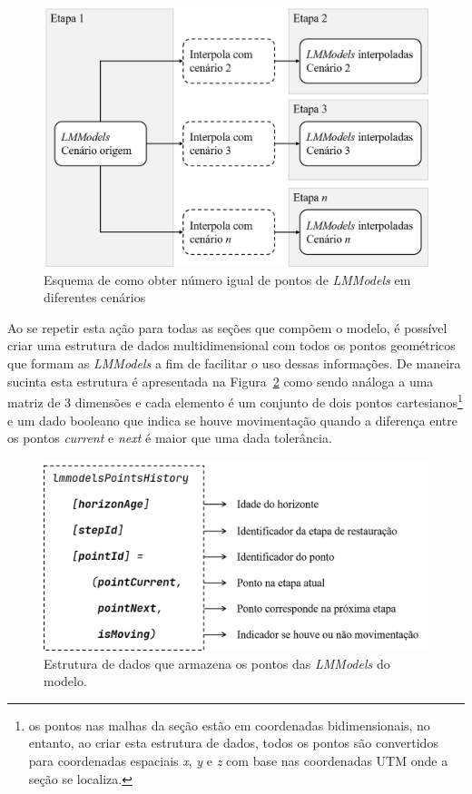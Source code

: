 \begin{figure} [H]
  \begin{center}
    \includegraphics[width=350pt]{images/fig-lmm-interp2}
    \caption{Esquema de como obter número igual de pontos de \textit{LMModels} em diferentes cenários}\label{fig-lmm-interp2}
  \end{center}
\end{figure}

Ao se repetir esta ação para todas as seções que compõem o modelo, é possível criar uma estrutura de dados multidimensional com todos os pontos geométricos que formam as \textit{LMModels} a fim de facilitar o uso dessas informações. De maneira sucinta esta estrutura é apresentada na Figura~\ref{fig-lmm-data-structure} como sendo análoga a uma matriz de 3 dimensões e cada elemento é um conjunto de dois pontos cartesianos\footnote{os pontos nas malhas da seção estão em coordenadas bidimensionais, no entanto, ao criar esta estrutura de dados, todos os pontos são convertidos para coordenadas espaciais \textit{x}, \textit{y} e \textit{z} com base nas coordenadas UTM onde a seção se localiza.} e um dado booleano que indica se houve movimentação quando a diferença entre os pontos \textit{current} e \textit{next} é maior que uma dada tolerância.

\begin{figure} [H]
  \begin{center}
    \includegraphics[width=350pt]{images/fig-lmm-data-structure}
    \caption{Estrutura de dados que armazena os pontos das \textit{LMModels} do modelo.}\label{fig-lmm-data-structure}
  \end{center}
\end{figure}

